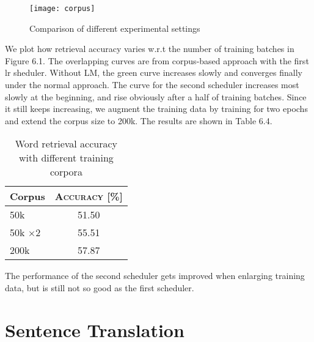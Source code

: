 \begin{figure}[h]
	\texttt{[image: corpus]}
	\centering
	\caption{Comparison of different experimental settings}
\end{figure}
We plot how retrieval accuracy varies w.r.t the number of training batches in Figure 6.1. The overlapping curves are from corpus-based approach with the first lr sheduler.  Without LM, the green curve increases slowly and converges finally under the normal approach. The curve for the second scheduler increases most slowly at the beginning, and rise obviously after a half of training batches. Since it still keeps increasing, we augment the training data by training for two epochs and extend the corpus size to 200k. The results are shown in Table 6.4.\\

\begin{table}[h]
	\centering
	\begin{tabular}{lc}
		\hline
		Corpus & \textsc{Accuracy} [\%] \\ \hline
		50k    & 51.50         \\ \hline
		50k $\times$2  & 55.51         \\ \hline
		200k   & 57.87         \\ \hline
	\end{tabular}
	\caption{Word retrieval accuracy with different training corpora}
\end{table}
The performance of the second scheduler gets improved when enlarging training data, but is still not so good as the first scheduler.  


\section{Sentence Translation}


